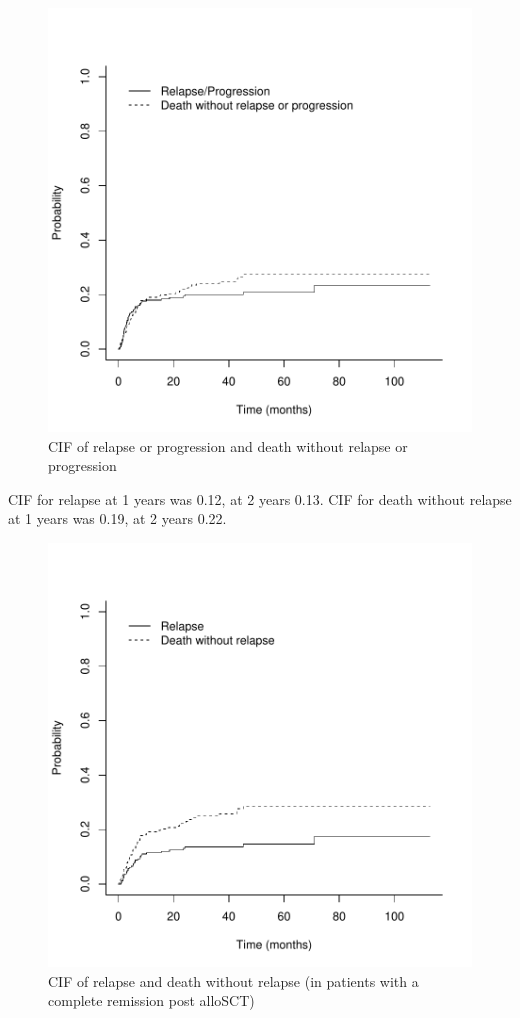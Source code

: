 \documentclass[a4paper,11pt] {article}
\begin{document}
\begin{figure}[h]
\begin{center}
\includegraphics{Rapport-fig6}
\end{center}
\caption{CIF of relapse or progression and death without relapse or progression}
\label{fig6}
\end{figure}

\pagebreak
CIF for relapse at 1 years was 0.12, at 2 years  0.13. CIF for death without relapse  at 1 years was 0.19, at 2 years  0.22. 
\begin{figure}[h]
\begin{center}
\includegraphics{Rapport-fig7}
\end{center}
\caption{CIF of relapse and death without relapse (in patients with a complete remission post alloSCT)}
\label{fig7}
\end{figure}
\end{document}
